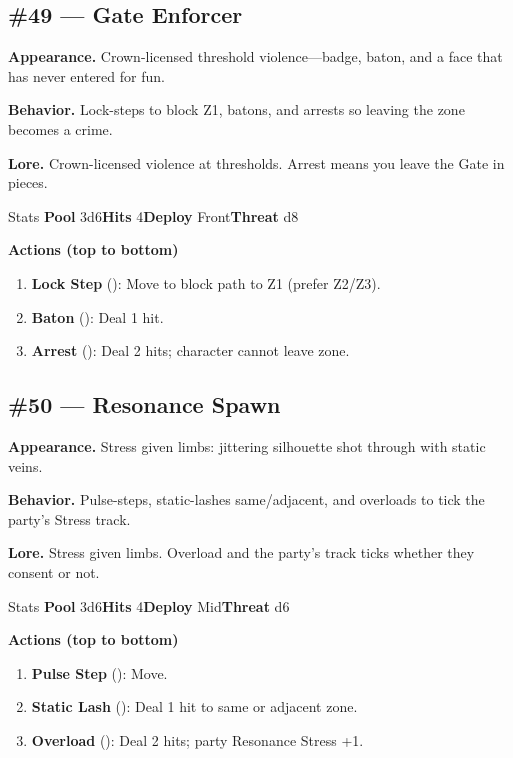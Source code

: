 \subsection*{\#49 --- Gate Enforcer}

\textbf{Appearance.} Crown-licensed threshold violence---badge, baton, and a face that has never entered for fun.

\textbf{Behavior.} Lock-steps to block Z1, batons, and arrests so leaving the zone becomes a crime.

\textbf{Lore.} Crown-licensed violence at thresholds. Arrest means you leave the Gate in pieces.

\begin{monsterentry}{Stats}
\textbf{Pool} 3d6\quad\textbf{Hits} 4\quad\textbf{Deploy} Front\quad\textbf{Threat} d8

\textbf{Actions (top to bottom)}
\begin{enumerate}\setlength{\itemsep}{0.15em}\setlength{\parskip}{0pt}
  \item \textbf{Lock Step} (\easy): Move to block path to Z1 (prefer Z2/Z3).
  \item \textbf{Baton} (\medium): Deal 1 hit.
  \item \textbf{Arrest} (\hard): Deal 2 hits; character cannot leave zone.
\end{enumerate}
\end{monsterentry}

\subsection*{\#50 --- Resonance Spawn}

\textbf{Appearance.} Stress given limbs: jittering silhouette shot through with static veins.

\textbf{Behavior.} Pulse-steps, static-lashes same/adjacent, and overloads to tick the party's Stress track.

\textbf{Lore.} Stress given limbs. Overload and the party's track ticks whether they consent or not.

\begin{monsterentry}{Stats}
\textbf{Pool} 3d6\quad\textbf{Hits} 4\quad\textbf{Deploy} Mid\quad\textbf{Threat} d6

\textbf{Actions (top to bottom)}
\begin{enumerate}\setlength{\itemsep}{0.15em}\setlength{\parskip}{0pt}
  \item \textbf{Pulse Step} (\easy): Move.
  \item \textbf{Static Lash} (\medium): Deal 1 hit to same or adjacent zone.
  \item \textbf{Overload} (\hard): Deal 2 hits; party Resonance Stress +1.
\end{enumerate}
\end{monsterentry}

